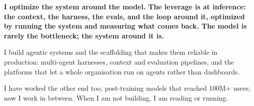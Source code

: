 \documentclass[a4paper,12pt]{article}
\begin{document}
\begin{tcolorbox}[colback=white, colframe=white, boxrule=0pt, arc=0mm, boxsep=0mm, width=\textwidth]
\begin{minipage}[t]{0.7\textwidth}
        \textbf{I optimize the system around the model. The leverage is at inference:
        the context, the harness, the evals, and the loop around it, optimized by
        running the system and measuring what comes back. The model is rarely the
        bottleneck; the system around it is.}
        \vspace{2em}

        I build agentic systems and the scaffolding that makes them reliable in
        production: multi-agent harnesses, context and evaluation pipelines, and the
        platforms that let a whole organisation run on agents rather than dashboards.

        \vspace{1em}

        I have worked the other end too, post-training models that reached 100M+ users;
        now I work in between. When I am not building, I am reading or running.
    \end{minipage}
\end{tcolorbox}
\end{document}
